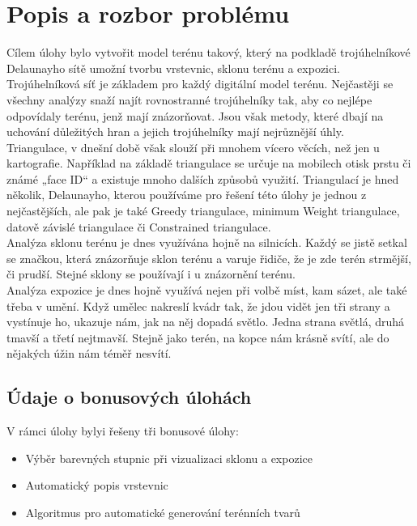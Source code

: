 \documentclass[a4paper,11pt,twoside]{article}
\begin{document}
\section{Popis a rozbor problému}
\large
\renewcommand{\baselinestretch}{1.4}
\noindent
Cílem úlohy bylo vytvořit model terénu takový, který na podkladě trojúhelníkové Delaunayho sítě umožní tvorbu vrstevnic, sklonu terénu a expozici. \\
\indent Trojúhelníková síť je základem pro každý digitální model terénu. Nejčastěji se všechny analýzy snaží najít rovnostranné trojúhelníky tak, aby co nejlépe odpovídaly terénu, jenž mají znázorňovat. Jsou však metody, které dbají na uchování důležitých hran a jejich trojúhelníky mají nejrůznější úhly. \\
\indent Triangulace, v dnešní době však slouží při mnohem vícero věcích, než jen u kartografie. Například na základě triangulace se určuje na mobilech otisk prstu či známé „face ID“ a existuje mnoho dalších způsobů využití. Triangulací je hned několik, Delaunayho, kterou používáme pro řešení této úlohy je jednou z nejčastějších, ale pak je také Greedy triangulace, minimum Weight triangulace, datově závislé triangulace či Constrained triangulace. \\
\indent Analýza sklonu terénu je dnes využívána hojně na silnicích. Každý se jistě setkal se značkou, která znázorňuje sklon terénu a varuje řidiče, že je zde terén strmější, či prudší. Stejné sklony se používají i u znázornění terénu. \\
\indent Analýza expozice je dnes hojně využívá nejen při volbě míst, kam sázet, ale také třeba v umění. Když umělec nakreslí kvádr tak, že jdou vidět jen tři strany a vystínuje ho, ukazuje nám, jak na něj dopadá světlo. Jedna strana světlá, druhá tmavší a třetí nejtmavší. Stejně jako terén, na kopce nám krásně svítí, ale do nějakých úžin nám téměř nesvítí.

\subsection{Údaje o bonusových úlohách}
\large
\noindent
V rámci úlohy bylyi řešeny tři bonusové úlohy:
\begin{itemize}
\item Výběr barevných stupnic při vizualizaci sklonu a expozice
\item Automatický popis vrstevnic
\item Algoritmus pro automatické generování terénních tvarů
\end{itemize}
\end{document}
